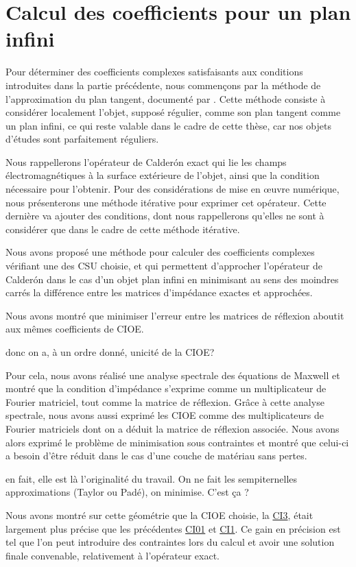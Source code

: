 \chapter{Calcul des coefficients pour un plan infini}
\label{sec:plan}
\minitoc
\newpage

Pour déterminer des coefficients complexes satisfaisants aux conditions introduites dans la partie précédente, nous commençons par la méthode de l'approximation du plan tangent, documenté par \cite{hoppe_impedance_1995,marceaux_high-order_2000,aubakirov_electromagnetic_2014}.
Cette méthode consiste à considérer localement l'objet, supposé régulier, comme son plan tangent comme un plan infini, ce qui reste valable dans le cadre de cette thèse, car nos objets d'études sont parfaitement réguliers.

Nous rappellerons l'opérateur de Calderón exact qui lie les champs électromagnétiques à la surface extérieure de l’objet, ainsi que la condition nécessaire pour l'obtenir.
Pour des considérations de mise en œuvre numérique, nous présenterons une méthode itérative pour exprimer cet opérateur.
Cette dernière va ajouter des conditions, dont nous rappellerons qu'elles ne sont à considérer que dans le cadre de cette méthode itérative.








Nous avons proposé une méthode pour calculer des coefficients complexes vérifiant une des CSU choisie, et qui permettent d'approcher l'opérateur de Calderón dans le cas d'un objet plan infini en minimisant au sens des moindres carrés la différence entre les matrices d'impédance exactes et approchées.

Nous avons montré que minimiser l'erreur entre les matrices de réflexion aboutit aux mêmes coefficients de CIOE.
\begin{REM}
	donc on a, à un ordre donné, unicité de la CIOE?
\end{REM} 
Pour cela, nous avons réalisé une analyse spectrale des équations de Maxwell et montré que la condition d'impédance s'exprime comme un multiplicateur de Fourier matriciel, tout comme la matrice de réflexion.
Grâce à cette analyse spectrale, nous avons aussi exprimé les CIOE comme des multiplicateurs de Fourier matriciels dont on a déduit la matrice de réflexion associée.
Nous avons alors exprimé le problème de minimisation sous contraintes et montré que celui-ci a besoin d'être réduit dans le cas d'une couche de matériau sans pertes.
\begin{REM}
  en fait, elle est là l’originalité du travail.
  On ne fait les sempiternelles approximations (Taylor ou Padé), on minimise. C'est ça ?
\end{REM} 
Nous avons montré sur cette géométrie que la CIOE choisie, la \hyperlink{ci3}{CI3}, était largement plus précise que les précédentes \hyperlink{ci01}{CI01} et \hyperlink{ci1}{CI1}.
Ce gain en précision est tel que l'on peut introduire des contraintes lors du calcul et avoir une solution finale convenable, relativement à l'opérateur exact.
